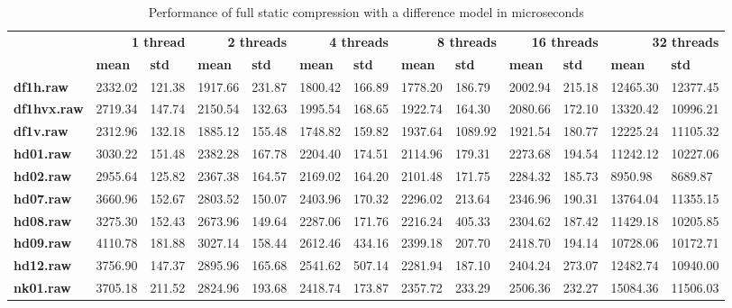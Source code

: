 \begin{table}[ht!]
\centering
\small
\begin{tabular}{l|ll|ll|ll|ll|ll|ll}
    & \multicolumn{2}{r|}{\textbf{1 thread}} & \multicolumn{2}{r|}{\textbf{2 threads}} & \multicolumn{2}{r|}{\textbf{4 threads}} & \multicolumn{2}{r|}{\textbf{8 threads}} & \multicolumn{2}{r|}{\textbf{16 threads}} & \multicolumn{2}{r}{\textbf{32 threads}} \\
    & \textbf{mean} & \textbf{std} & \textbf{mean} & \textbf{std} & \textbf{mean} & \textbf{std} & \textbf{mean} & \textbf{std} & \textbf{mean} & \textbf{std} & \textbf{mean} & \textbf{std} \\
\hline
    \textbf{df1h.raw} & 2332.02 & 121.38 & 1917.66 & 231.87 & 1800.42 & 166.89 & 1778.20 & 186.79 & 2002.94 & 215.18 & 12465.30 & 12377.45 \\
    \textbf{df1hvx.raw} & 2719.34 & 147.74 & 2150.54 & 132.63 & 1995.54 & 168.65 & 1922.74 & 164.30 & 2080.66 & 172.10 & 13320.42 & 10996.21 \\
    \textbf{df1v.raw} & 2312.96 & 132.18 & 1885.12 & 155.48 & 1748.82 & 159.82 & 1937.64 & 1089.92 & 1921.54 & 180.77 & 12225.24 & 11105.32 \\
    \textbf{hd01.raw} & 3030.22 & 151.48 & 2382.28 & 167.78 & 2204.40 & 174.51 & 2114.96 & 179.31 & 2273.68 & 194.54 & 11242.12 & 10227.06 \\
    \textbf{hd02.raw} & 2955.64 & 125.82 & 2367.38 & 164.57 & 2169.02 & 164.20 & 2101.48 & 171.75 & 2284.32 & 185.73 & 8950.98 & 8689.87 \\
    \textbf{hd07.raw} & 3660.96 & 152.67 & 2803.52 & 150.07 & 2403.96 & 170.32 & 2296.02 & 213.64 & 2346.96 & 190.31 & 13764.04 & 11355.15 \\
    \textbf{hd08.raw} & 3275.30 & 152.43 & 2673.96 & 149.64 & 2287.06 & 171.76 & 2216.24 & 405.33 & 2304.62 & 187.42 & 11429.18 & 10205.85 \\
    \textbf{hd09.raw} & 4110.78 & 181.88 & 3027.14 & 158.44 & 2612.46 & 434.16 & 2399.18 & 207.70 & 2418.70 & 194.14 & 10728.06 & 10172.71 \\
    \textbf{hd12.raw} & 3756.90 & 147.37 & 2895.96 & 165.68 & 2541.62 & 507.14 & 2281.94 & 187.10 & 2404.24 & 273.07 & 12482.74 & 10940.00 \\
    \textbf{nk01.raw} & 3705.18 & 211.52 & 2824.96 & 193.68 & 2418.74 & 173.87 & 2357.72 & 233.29 & 2506.36 & 232.27 & 15084.36 & 11506.03 \\
\end{tabular}
\caption{Performance of full static compression with a difference model in microseconds}
\end{table}
